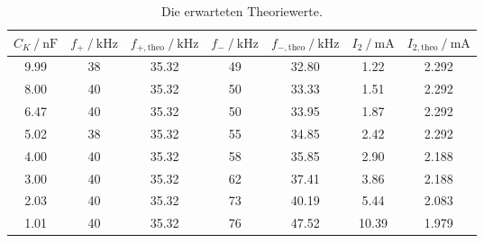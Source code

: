 \begin{table}[H]
  \centering
  \caption{Die erwarteten Theoriewerte.}
  \label{tab:theorietabelle}
  \begin{tabular}{c c c c c c c}
      \toprule
      $C_K \:/\: \si{\nano\farad}$ & $f_+ \:/\: \si{\kilo\hertz}$ & $f_{+, \text{theo}} \:/\: \si{\kilo\hertz}$ & $f_- \:/\: \si{\kilo\hertz}$ & $f_{-, \text{theo}} \:/\: \si{\kilo\hertz}$ & $I_2 \:/\: \si{\milli\ampere}$ & $I_{2,\text{theo}} \:/\: \si{\milli\ampere}$ \\
      \midrule
      9.99 & 38 & 35.32 & 49 & 32.80 & 1.22 & 2.292 \\
      8.00 & 40 & 35.32 & 50 & 33.33 & 1.51 & 2.292 \\
      6.47 & 40 & 35.32 & 50 & 33.95 & 1.87 & 2.292 \\
      5.02 & 38 & 35.32 & 55 & 34.85 & 2.42 & 2.292 \\
      4.00 & 40 & 35.32 & 58 & 35.85 & 2.90 & 2.188 \\
      3.00 & 40 & 35.32 & 62 & 37.41 & 3.86 & 2.188 \\
      2.03 & 40 & 35.32 & 73 & 40.19 & 5.44 & 2.083 \\
      1.01 & 40 & 35.32 & 76 & 47.52 & 10.39 & 1.979 \\
      \bottomrule
  \end{tabular}
\end{table}

\pagebreak
